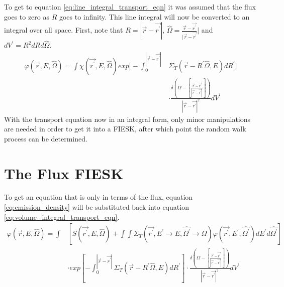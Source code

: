 To get to equation \ref{eq:line_integral_transport_eqn} it was assumed that the
flux goes to zero as $R$ goes to infinity. This line integral will now be 
converted to an integral over all space. First, note that 
$R = |\vec{r} - \vec{r^{'}}|$, 
$\hat{\Omega} = \frac{\vec{r} - \vec{r^{'}}}{|\vec{r} - \vec{r^{'}}}|$ and
$dV^{'} = R^2dRd\hat{\Omega}$.
\begin{equation}
  \begin{split}
    \varphi(\vec{r},E,\hat{\Omega}) = 
    \int \chi(\vec{r^{'}},E,\hat{\Omega})
    exp\Big[-\int_0^{|\vec{r} - \vec{r^{'}}|} 
      &\Sigma_T(\vec{r}-R^{'}\hat{\Omega},E)dR^{'} \Big] \\
    &\cdot \frac{\delta \left(\Omega - \left[\frac{\vec{r} - \vec{r^{'}}}
        {|\vec{r} - \vec{r^{'}}|}\right]\right)}
    {|\vec{r} - \vec{r^{'}}|^2} dV^{'}
  \end{split}
  \label{eq:volume_integral_transport_eqn}
\end{equation}
With the transport equation now in an integral form, only minor manipulations
are needed in order to get it into a FIESK, after which point the random walk 
process can be determined.

\section{The Flux FIESK}
To get an equation that is only in terms of the flux, equation 
\ref{eq:emission_density} will be substituted back into equation 
\ref{eq:volume_integral_transport_eqn}.
\begin{equation*}
  \begin{split}
    \varphi(\vec{r},E,\hat{\Omega}) = \int &\left[
    S(\vec{r^{'}},E,\hat{\Omega}) + 
    \int\int \Sigma_T(\vec{r^{'}},E^{'} \to E, \hat{\Omega^{'}} \to \hat{\Omega})
    \varphi(\vec{r^{'}},E^{'},\hat{\Omega^{'}})dE^{'}d\hat{\Omega^{'}} \right] \\
    & \cdot exp\left[-\int_0^{|\vec{r} - \vec{r^{'}}|} 
      \Sigma_T(\vec{r}-R^{'}\hat{\Omega},E)dR^{'} \right]
    \cdot \frac{\delta \left(\Omega - \left[\frac{\vec{r} - \vec{r^{'}}}
        {|\vec{r} - \vec{r^{'}}|}\right]\right)} 
    {|\vec{r} - \vec{r^{'}}|^2} dV^{'}
  \end{split}
\end{equation*}

